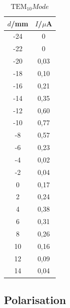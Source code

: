 \begin{table}[H]
	\begin{center}
		\begin{tabular}{c c}
			\toprule
			\(d\)/mm & \(I\)/\(\mu\)A \\
			\midrule
			-24     &0\\
			-22     &0\\
			-20     &0,03\\
			-18     &0,10\\
			-16     &0,21\\
			-14     &0,35\\
			-12     &0,60\\
			-10     &0,77\\
			-8      &0,57\\
			-6      &0,23\\
			-4      &0,02\\
			-2      &0,04\\
			0       &0,17\\
			2       &0,24\\
			4       &0,38\\
			6       &0,31\\
			8       &0,26\\
			10     & 0,16\\
			12      &0,09\\
			14      &0,04\\
			\bottomrule
		\end{tabular}
		\caption{\(\text{TEM}_{10} Mode\)}
		\label{tab:t6}
	\end{center}
\end{table}

\subsection{Polarisation}

